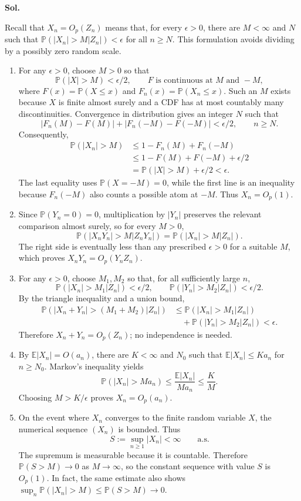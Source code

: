 \documentclass[lang=en,11pt,a4paper,citestyle=authoryear]{elegantpaper}
\newcommand{\E}{\mathbb{E}}
\renewcommand{\P}{\mathbb{P}}
\begin{document}
\par\vspace{0.5em}\noindent\textbf{Sol.}\par
Recall that $X_n=O_p(Z_n)$ means that, for every $\epsilon>0$,
there are $M<\infty$ and $N$ such that
$\P(|X_n|>M|Z_n|)<\epsilon$ for all $n\ge N$.
This formulation avoids dividing by a possibly zero random scale.
\begin{enumerate}[label=(\alph*),leftmargin=*]
\item For any $\epsilon>0$, choose $M>0$ so that
\[
\P(|X|>M)<\epsilon/2,
\qquad F\text{ is continuous at }M\text{ and }-M,
\]
where $F(x)=\P(X\le x)$ and $F_n(x)=\P(X_n\le x)$.
Such an $M$ exists because $X$ is finite almost surely and a CDF
has at most countably many discontinuities.
Convergence in distribution gives an integer $N$ such that
\[
|F_n(M)-F(M)|+|F_n(-M)-F(-M)|<\epsilon/2,
\qquad n\ge N.
\]
Consequently,
\[
\begin{aligned}
\P(|X_n|>M)
&\le 1-F_n(M)+F_n(-M)\\
&\le 1-F(M)+F(-M)+\epsilon/2\\
&=\P(|X|>M)+\epsilon/2<\epsilon.
\end{aligned}
\]
The last equality uses $\P(X=-M)=0$, while the first line is an
inequality because $F_n(-M)$ also counts a possible atom at $-M$.
Thus $X_n=O_p(1)$.

\item Since $\P(Y_n=0)=0$, multiplication by $|Y_n|$ preserves the
relevant comparison almost surely, so for every $M>0$,
\[
\P(|X_nY_n|>M|Z_nY_n|)
=\P(|X_n|>M|Z_n|).
\]
The right side is eventually less than any prescribed $\epsilon>0$
for a suitable $M$, which proves $X_nY_n=O_p(Y_nZ_n)$.

\item For any $\epsilon>0$, choose $M_1,M_2$ so that, for all
sufficiently large $n$,
\[
\P(|X_n|>M_1|Z_n|)<\epsilon/2,
\qquad
\P(|Y_n|>M_2|Z_n|)<\epsilon/2.
\]
By the triangle inequality and a union bound,
\[
\begin{aligned}
\P(|X_n+Y_n|>(M_1+M_2)|Z_n|)
&\le\P(|X_n|>M_1|Z_n|)\\
&\quad+\P(|Y_n|>M_2|Z_n|)<\epsilon.
\end{aligned}
\]
Therefore $X_n+Y_n=O_p(Z_n)$; no independence is needed.

\item By $\E|X_n|=O(a_n)$, there are $K<\infty$ and $N_0$ such that
$\E|X_n|\le Ka_n$ for $n\ge N_0$. Markov's inequality yields
\[
\P(|X_n|>Ma_n)\le\frac{\E|X_n|}{Ma_n}\le\frac KM.
\]
Choosing $M>K/\epsilon$ proves $X_n=O_p(a_n)$.

\item On the event where $X_n$ converges to the finite random variable
$X$, the numerical sequence $(X_n)$ is bounded. Thus
\[
S:=\sup_{n\ge1}|X_n|<\infty\qquad\text{a.s.}
\]
The supremum is measurable because it is countable. Therefore
$\P(S>M)\to0$ as $M\to\infty$, so the constant sequence with value
$S$ is $O_p(1)$. In fact, the same estimate also shows
$\sup_n\P(|X_n|>M)\le\P(S>M)\to0$.
\end{enumerate}
\vspace{2em}
\end{document}
